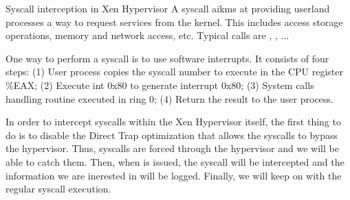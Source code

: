 
Syscall interception in Xen Hypervisor
A syscall aikms at providing userland processes a way to request services 
from the kernel. This includes access storage operations, memory and network 
access, etc. Typical calls are \open, \close, \read... 

One way to perform a syscall is to use software interrupts. It consists of 
four steps: (1) User process copies the syscall number to execute in the CPU register 
\%EAX; (2) Execute int 0x80 to generate interrupt 0x80; (3) System calls handling 
routine executed in ring 0; (4) Return the result to the user process.

In order to intercept syscalls within the Xen Hypervisor itself, the first thing to do 
is to disable the Direct Trap optimization that allows the syscalls to bypass the 
hypervisor. Thus, syscalls are forced through the hypervisor and we will be able to 
catch them.  Then, when is issued, the syscall will be intercepted and the information 
we are inerested in will be logged. Finally, we will keep on with the regular syscall 
execution.

